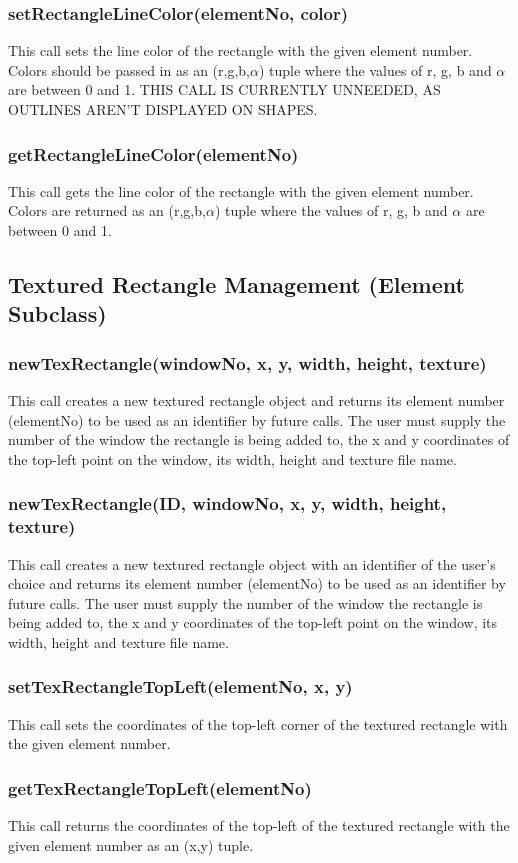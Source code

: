 \documentclass{acm_proc_article-sp}
\begin{document}
\subsubsection{setRectangleLineColor(elementNo, color)}
This call sets the line color of the rectangle with the given element number. Colors should be passed in as an (r,g,b,$\alpha$) tuple where the values of r, g, b and $\alpha$ are between 0 and 1. THIS CALL IS CURRENTLY UNNEEDED, AS OUTLINES AREN'T DISPLAYED ON SHAPES.
\subsubsection{getRectangleLineColor(elementNo)}
This call gets the line color of the rectangle with the given element number. Colors are returned as an (r,g,b,$\alpha$) tuple where the values of r, g, b and $\alpha$ are between 0 and 1.
\subsection{Textured Rectangle Management (Element Subclass)}
\subsubsection{newTexRectangle(windowNo, x, y, width, height, texture)}
This call creates a new textured rectangle object and returns its element number (elementNo) to be used as an identifier by future calls. The user must supply the number of the window the rectangle is being added to, the x and y coordinates of the top-left point on the window, its width, height and texture file name.
\subsubsection{newTexRectangle(ID, windowNo, x, y, width, height, texture)}
This call creates a new textured rectangle object with an identifier of the user's choice and returns its element number (elementNo) to be used as an identifier by future calls. The user must supply the number of the window the rectangle is being added to, the x and y coordinates of the top-left point on the window, its width, height and texture file name.
\subsubsection{setTexRectangleTopLeft(elementNo, x, y)}
This call sets the coordinates of the top-left corner of the textured rectangle with the given element number.
\subsubsection{getTexRectangleTopLeft(elementNo)}
This call returns the coordinates of the top-left of the textured rectangle with the given element number as an (x,y) tuple.
\end{document}
